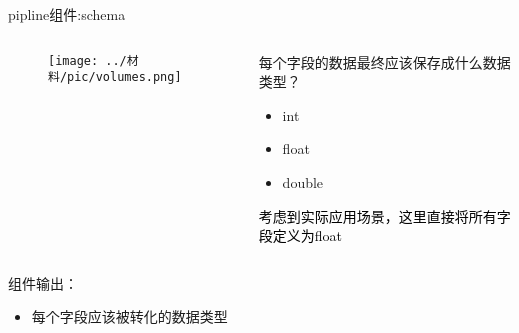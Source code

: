 \documentclass[notheorems, aspectratio=1610]{beamer}
\begin{document}
\begin{frame}
    \Large pipline组件:schema
    \newline
    \normalsize
    \begin{columns}
        
        \begin{column}{0.5\textwidth}
            \begin{figure}[h] %
                \centering %
                \texttt{[image: ../材料/pic/volumes.png]} %
            \end{figure}%
        \end{column}
        \begin{column}{0.5\textwidth}
            每个字段的数据最终应该保存成什么数据类型？
            \begin{itemize}
                \item int
                \item float
                \item double
            \end{itemize}
            \textcolor{black}{考虑到实际应用场景，这里直接将所有字段定义为float}
        \end{column}
    \end{columns}
    组件输出：
    \begin{itemize}
        \item 每个字段应该被转化的数据类型
    \end{itemize}
\end{frame}
\end{document}
